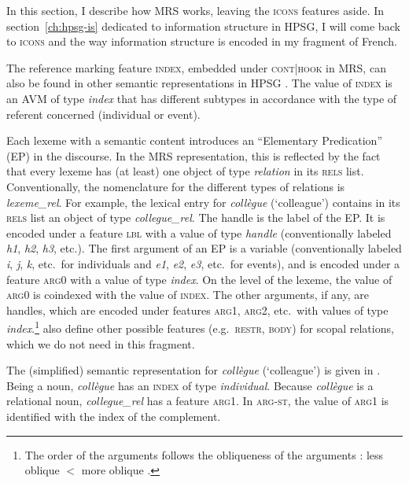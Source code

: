 In this section, I describe how MRS works, leaving the \textsc{icons} features aside. In section~\ref{ch:hpsg-is} dedicated to information structure in HPSG, I will come back to \textsc{icons} and the way information structure is encoded in my fragment of French.

The reference marking feature \textsc{index}, embedded under \textsc{cont|hook} in MRS, can also be found in other semantic representations in HPSG \citep[see][24--26]{Pollard.1994}. The value of \textsc{index} is an AVM of type \emph{index} that has different subtypes in accordance with the type of referent concerned (individual or event). 

Each lexeme with a semantic content introduces an ``Elementary Predication'' (EP) in the discourse. In the MRS representation, this is reflected by the fact that every lexeme has (at least) one object of type \emph{relation} in its \textsc{rels} list. Conventionally, the nomenclature for the different types of relations is \emph{lexeme\_rel}. For example, the lexical entry for \emph{collègue} (`colleague') contains in its \textsc{rels} list an object of type \emph{collegue\_rel}. The handle is the label of the EP. It is encoded under a feature \textsc{lbl} with a value of type \emph{handle}  (conventionally labeled \emph{h1}, \emph{h2}, \emph{h3}, etc.). The first argument of an EP is a variable (conventionally labeled \emph{i}, \emph{j}, \emph{k}, etc.\ for individuals and \emph{e1}, \emph{e2}, \emph{e3}, etc.\ for events), and is encoded under a feature \textsc{arg0} with a value of type \emph{index}. On the level of the lexeme, the value of \textsc{arg0} is coindexed with the value of \textsc{index}. The other arguments, if any, are handles, which are encoded under features \textsc{arg1}, \textsc{arg2}, etc.\ with values of type \emph{index}.\footnote{The order of the arguments follows the obliqueness of the arguments \citep{Keenan.1977}: less oblique $<$ more oblique \citep[287]{Copestake.2005}.} \citet{Copestake.2005} also define other possible features (e.g.\ \textsc{restr}, \textsc{body}) for scopal relations, which we do not need in this fragment. 

The (simplified) semantic representation for \emph{collègue} (`colleague') is given in . Being a noun, \emph{collègue} has an \textsc{index} of type \textit{individual}. Because \emph{collègue} is a relational noun, \mbox{\emph{collegue\_rel}} has a feature \textsc{arg1}. In \textsc{arg-st}, the value of \textsc{arg1} is identified with the index of the complement.

